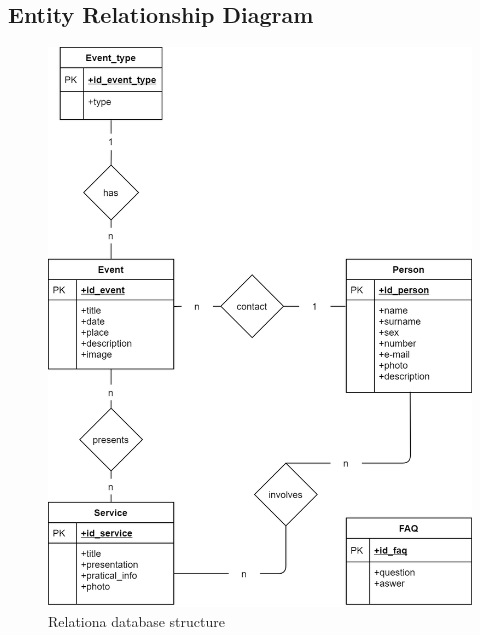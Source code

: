 \subsection{Entity Relationship Diagram}
\begin{figure}[h!]
		\centering
		\begin{minipage}[b]{1\textwidth}
    			\includegraphics[width=\textwidth]{./assets/ER_diagram.png}
			\caption{Relationa database structure}
		\end{minipage}
\end{figure}
\FloatBarrier

